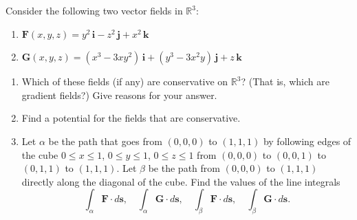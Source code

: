 \documentclass[openany]{book}
\begin{document}
\begin{prob}[21]
    Consider the following two vector fields in \( \mathbb{R}^3 \):  

    \begin{enumerate}
        \item[(i)] \( \mathbf{F}(x, y, z) = y^2 \, \mathbf{i} - z^2 \, \mathbf{j} + x^2 \, \mathbf{k} \)
        \item[(ii)] \( \mathbf{G}(x, y, z) = (x^3 - 3xy^2) \, \mathbf{i} + (y^3 - 3x^2 y) \, \mathbf{j} + z \, \mathbf{k} \)
    \end{enumerate}

    \begin{enumerate}
        \item[(a)] Which of these fields (if any) are conservative on \( \mathbb{R}^3 \)? (That is, which are gradient fields?) Give reasons for your answer.  

        \item[(b)] Find a potential for the fields that are conservative.  

        \item[(c)] Let \( \alpha \) be the path that goes from \( (0, 0, 0) \) to \( (1, 1, 1) \) by following edges of the cube \( 0 \leq x \leq 1 \),  
        \( 0 \leq y \leq 1 \), \( 0 \leq z \leq 1 \) from \( (0, 0, 0) \) to \( (0, 0, 1) \) to \( (0, 1, 1) \) to \( (1, 1, 1) \).  
        Let \( \beta \) be the path from \( (0, 0, 0) \) to \( (1, 1, 1) \) directly along the diagonal of the cube.  
        Find the values of the line integrals  
        \[
        \int_{\alpha} \mathbf{F} \cdot d\mathbf{s}, \quad 
        \int_{\alpha} \mathbf{G} \cdot d\mathbf{s}, \quad 
        \int_{\beta} \mathbf{F} \cdot d\mathbf{s}, \quad 
        \int_{\beta} \mathbf{G} \cdot d\mathbf{s}.
        \]
    \end{enumerate}
\end{prob}
\end{document}

